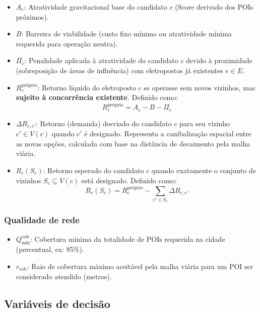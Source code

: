 \begin{itemize}
    \item $A_c$: Atratividade gravitacional base do candidato $c$ (Score derivado dos POIs próximos).
    \item $B$: Barreira de viabilidade (custo fixo mínimo ou atratividade mínima requerida para operação neutra).
    \item $\Pi_c$: Penalidade aplicada à atratividade do candidato $c$ devido à proximidade (sobreposição de áreas de influência) com eletropostos já existentes $e \in E$.
    
    \item $R_c^{\text{próprio}}$: Retorno líquido do eletroposto $c$ se operasse sem novos vizinhos, mas \textbf{sujeito à concorrência existente}. Definido como:
    \begin{equation}
        R_c^{\text{próprio}} = A_c - B - \Pi_c
    \end{equation}
    
    \item $\Delta R_{c,c'}$: Retorno (demanda) desviado do candidato $c$ para seu vizinho $c' \in V(c)$ quando $c'$ é designado. Representa a canibalização espacial entre as novas opções, calculada com base na distância de decaimento pela malha viária.
    
    \item $R_c(S_c)$: Retorno esperado do candidato $c$ quando exatamente o conjunto de vizinhos $S_c \subseteq V(c)$ está designado. Definido como:
    \begin{equation}
    R_c(S_c) = R_c^{\text{próprio}} - \sum_{c' \in S_c} \Delta R_{c,c'}
    \end{equation}
\end{itemize}

\subsubsection{Qualidade de rede}

\begin{itemize}
    \item $Q_{\min}^{\text{cob}}$: Cobertura mínima da totalidade de POIs requerida na cidade (percentual, ex: 85\%).
    \item $r_{\text{cob}}$: Raio de cobertura máximo aceitável pela malha viária para um POI ser considerado atendido (metros).
\end{itemize}

\subsection{Variáveis de decisão}

